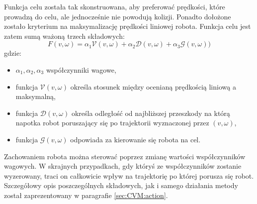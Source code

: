 	Funkcja celu została tak skonstruowana, aby preferować prędkości, które prowadzą do celu, ale jednocześnie  
	nie powodują kolizji. Ponadto dołożone zostało kryterium na maksymalizację prędkości liniowej robota. Funkcja celu jest zatem sumą ważoną trzech składowych: 
	\begin{equation} \label{eq:fcelu_cvm}
	F(v,\omega)=\alpha_1 \mathcal{V}(v,\omega)+\alpha_2 \mathcal{D}(v,\omega) + \alpha_3 \mathcal{G} (v,\omega))
	\end{equation}
	gdzie:
	\begin{itemize}
	 \item $\alpha_1, \alpha_2, \alpha_3$ współczynniki wagowe,
	 \item funkcja $\mathcal{V}(v,\omega)$ określa stosunek między ocenianą prędkością liniową a maksymalną,
	 \item funkcja $\mathcal{D}(v,\omega)$ określa odległość od najbliższej przeszkody na którą napotka robot poruszający się po trajektorii wyznaczonej przez $(v,\omega)$,
	 \item funkcja $\mathcal{G}(v,\omega)$ odpowiada za kierowanie się robota na cel.
	\end{itemize}
	Zachowaniem robota można sterować poprzez zmianę wartości współczynników wagowych. W skrajnych przypadkach,
	gdy któryś ze współczynników zostanie wyzerowany, traci on całkowicie wpływ na trajektorię po której
	porusza się robot. Szczegółowy opis poszczególnych składowych, jak i samego działania metody został
	zaprezentowany w paragrafie \ref{sec:CVM:action}.

